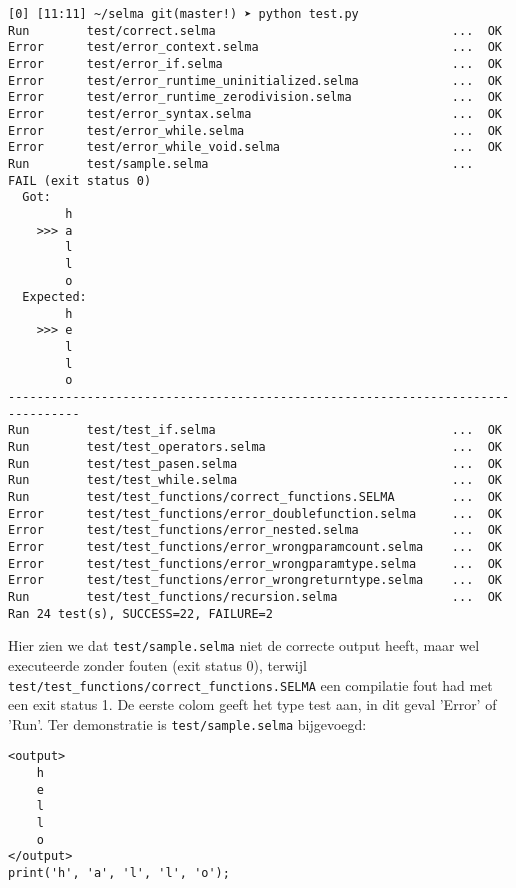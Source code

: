 \documentclass[]{article}
\begin{document}
\begin{lstlisting}[style=SELMA]
[0] [11:11] ~/selma git(master!) ➤ python test.py
Run        test/correct.selma                                 ...  OK
Error      test/error_context.selma                           ...  OK
Error      test/error_if.selma                                ...  OK
Error      test/error_runtime_uninitialized.selma             ...  OK
Error      test/error_runtime_zerodivision.selma              ...  OK
Error      test/error_syntax.selma                            ...  OK
Error      test/error_while.selma                             ...  OK
Error      test/error_while_void.selma                        ...  OK
Run        test/sample.selma                                  ...  FAIL (exit status 0)
  Got:
        h
    >>> a
        l
        l
        o
  Expected:
        h
    >>> e
        l
        l
        o
--------------------------------------------------------------------------------
Run        test/test_if.selma                                 ...  OK
Run        test/test_operators.selma                          ...  OK
Run        test/test_pasen.selma                              ...  OK
Run        test/test_while.selma                              ...  OK
Run        test/test_functions/correct_functions.SELMA        ...  OK
Error      test/test_functions/error_doublefunction.selma     ...  OK
Error      test/test_functions/error_nested.selma             ...  OK
Error      test/test_functions/error_wrongparamcount.selma    ...  OK
Error      test/test_functions/error_wrongparamtype.selma     ...  OK
Error      test/test_functions/error_wrongreturntype.selma    ...  OK
Run        test/test_functions/recursion.selma                ...  OK
Ran 24 test(s), SUCCESS=22, FAILURE=2

\end{lstlisting}

Hier zien we dat \texttt{test/sample.selma} niet de correcte output heeft, maar wel executeerde zonder fouten (exit status 0), terwijl \texttt{test/test\_functions/correct\_functions.SELMA} een compilatie fout had met een exit status 1. De eerste colom geeft het type test aan, in dit geval 'Error' of 'Run'. Ter demonstratie is \texttt{test/sample.selma} bijgevoegd:


\begin{lstlisting}[style=SELMA]
<output>
    h
    e
    l
    l
    o
</output>
print('h', 'a', 'l', 'l', 'o');
\end{lstlisting}
\end{document}
